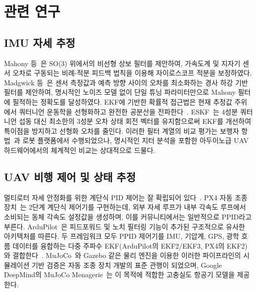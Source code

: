 \section{관련 연구}
\label{sec:related}

\subsection{IMU 자세 추정}

Mahony 등~\cite{mahony2008}은 SO(3) 위에서의 비선형 상보 필터를 제안하여,
가속도계 및 지자기 센서 오차로 구동되는 비례-적분 피드백 법칙을 이용해 자이로스코프 적분을 보정하였다.
Madgwick 등~\cite{madgwick2011}은 센서 측정값과 예측 방향 사이의 오차를 최소화하는
경사 하강 기반 필터를 제안하여, 명시적인 노이즈 모델 없이 단일 튜닝 파라미터만으로
Mahony 필터에 필적하는 정확도를 달성하였다.
EKF에 기반한 확률적 접근법은 현재 추정값 주위에서 쿼터니언 운동학을 선형화하고
완전한 공분산을 전파한다~\cite{bar-shalom2001}.
ESKF~\cite{sola2017}는 4성분 쿼터니언 섭동 대신 최소한의 3성분 오차 상태 회전 벡터를 유지함으로써
EKF를 개선하여 특이점을 방지하고 선형화 오차를 줄인다.
이러한 필터 계열의 비교 평가는 보행자 항법~\cite{woodman2007}과 로봇 플랫폼에서 수행되었으나,
명시적인 지터 분석을 포함한 아두이노급 UAV 하드웨어에서의 체계적인 비교는 상대적으로 드물다.

\subsection{UAV 비행 제어 및 상태 추정}

멀티로터 자세 안정화를 위한 계단식 PID 제어는 잘 확립되어 있다~\cite{bouabdallah2004}.
PX4 자동 조종 장치~\cite{px4docs}는 2단계 계단식 제어기를 구현하는데,
외부 자세 루프가 내부 각속도 루프에서 소비되는 동체 각속도 설정값을 생성하며,
이를 커뮤니티에서는 일반적으로 PPID라고 부른다.
ArduPilot~\cite{ardupilotdocs}은 피드포워드 및 노치 필터링 기능이 추가된 구조적으로 유사한 아키텍처를 따른다.
두 프레임워크 모두 PPID 제어기를 IMU, 기압계, GPS, 광학 흐름 데이터를 융합하는
다중 주파수 EKF(ArduPilot의 EKF2/EKF3, PX4의 EKF2)와 결합한다~\cite{mahony2008}.
MuJoCo~\cite{todorov2012}와 Gazebo 같은 물리 엔진을 이용한 이러한 파이프라인의 시뮬레이션 기반 검증은
자동 조종 장치 개발의 표준 관행이 되었으며,
Google DeepMind의 MuJoCo Menagerie~\cite{deepmind2022}는
이 목적에 적합한 고충실도 항공기 모델을 제공한다.

